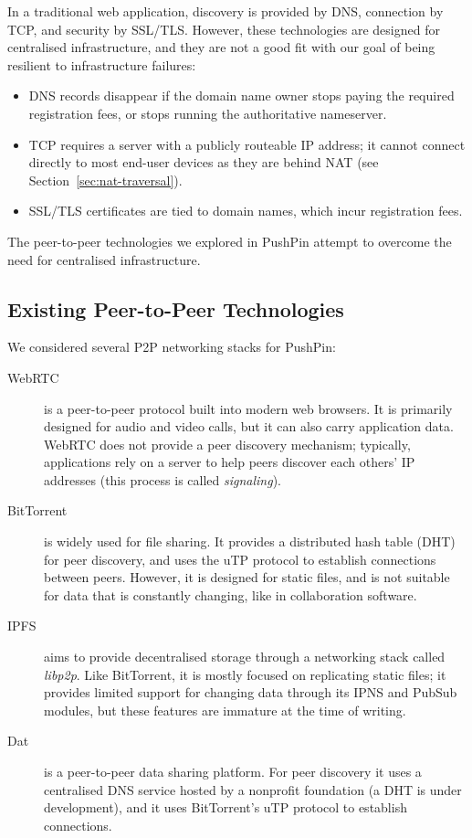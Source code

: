 \documentclass[sigplan,10pt]{acmart}
\begin{document}
In a traditional web application, discovery is provided by DNS, connection by TCP, and security by SSL/TLS.
However, these technologies are designed for centralised infrastructure, and they are not a good fit with our goal of being resilient to infrastructure failures:
\begin{itemize}
    \item DNS records disappear if the domain name owner stops paying the required registration fees, or stops running the authoritative nameserver.
    \item TCP requires a server with a publicly routeable IP address; it cannot connect directly to most end-user devices as they are behind NAT (see Section~\ref{sec:nat-traversal}).
    \item SSL/TLS certificates are tied to domain names, which incur registration fees.
\end{itemize}

The peer-to-peer technologies we explored in PushPin attempt to overcome the need for centralised infrastructure.

\subsection{Existing Peer-to-Peer Technologies}\label{sec:existing-p2p}

We considered several P2P networking stacks for PushPin:
\begin{description}
\item[WebRTC] is a peer-to-peer protocol built into modern web browsers.
It is primarily designed for audio and video calls, but it can also carry application data.
WebRTC does not provide a peer discovery mechanism; typically, applications rely on a server to help peers discover each others' IP addresses (this process is called \emph{signaling}).
\item[BitTorrent] is widely used for file sharing.
It provides a distributed hash table (DHT) for peer discovery, and uses the uTP protocol to establish connections between peers.
However, it is designed for static files, and is not suitable for data that is constantly changing, like in collaboration software.
\item[IPFS] aims to provide decentralised storage through a networking stack called \emph{libp2p}.
Like BitTorrent, it is mostly focused on replicating static files; it provides limited support for changing data through its IPNS and PubSub modules, but these features are immature at the time of writing.
\item[Dat] \cite{HowDatWorks,Ogden:2018ur} is a peer-to-peer data sharing platform.
For peer discovery it uses a centralised DNS service hosted by a nonprofit foundation (a DHT is under development), and it uses BitTorrent's uTP protocol to establish connections.
\end{description}
\end{document}
